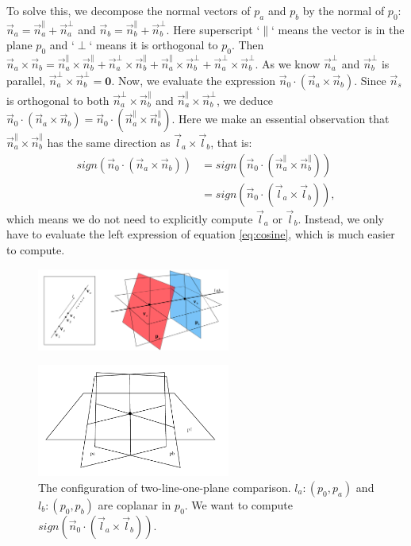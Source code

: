 \documentclass[10pt,journal,compsoc]{IEEEtran}
\begin{document}
To solve this, we decompose the normal vectors of $p_a$ and $p_b$ by the normal of $p_0$: $\vec{n}_a = \vec{n}^\parallel_a + \vec{n}^\perp_a$ and $\vec{n}_b = \vec{n}^\parallel_b + \vec{n}^\perp_b$. Here superscript `$\parallel$` means the vector is in the plane $p_0$ and `$\perp$` means it is orthogonal to $p_0$. Then $\vec{n}_a \times \vec{n}_b = \vec{n}^\parallel_a \times \vec{n}^\parallel_b + \vec{n}^\perp_a \times \vec{n}^\parallel_b + \vec{n}^\parallel_a \times \vec{n}^\perp_b + \vec{n}^\perp_a \times \vec{n}^\perp_b$. As we know $\vec{n}^\perp_a$ and $\vec{n}^\perp_b$ is parallel, $\vec{n}^\perp_a \times \vec{n}^\perp_b = \textbf{0}$. Now, we evaluate the expression $\vec{n}_0 \cdot (\vec{n}_a \times \vec{n}_b)$. Since $\vec{n}_s$ is orthogonal to both $\vec{n}^\perp_a \times \vec{n}^\parallel_b $ and $\vec{n}^\parallel_a \times \vec{n}^\perp_b $, we deduce $\vec{n}_0 \cdot (\vec{n}_a \times \vec{n}_b) = \vec{n}_0 \cdot (\vec{n}^\parallel_a \times \vec{n}^\parallel_b)$. Here we make an essential observation that $\vec{n}^\parallel_a \times \vec{n}^\parallel_b$ has the same direction as $\vec{l}_a \times \vec{l}_b$, that is:
\begin{equation}
\begin{split}
\label{eq:cosine}
sign(\vec{n}_0 \cdot (\vec{n}_a \times \vec{n}_b)) &= sign(\vec{n}_0 \cdot (\vec{n}^\parallel_a \times \vec{n}^\parallel_b)) \\
&=  sign(\vec{n}_0 \cdot (\vec{l}_a \times \vec{l}_b)),
\end{split}
\end{equation}
which means we do not need to explicitly compute $\vec{l}_a$ or $\vec{l}_b$. Instead, we only have to evaluate the left expression of equation \ref{eq:cosine}, which is much easier to compute.

\begin{figure}
  \centering
  \includegraphics[width=2.5in]{twopointoneline}\\
  \caption{{\color{red}{Sketch: config of two point one line comparison}}}\label{fig:twopointoneline}
\end{figure}

\begin{figure}[t]
\centering
\includegraphics[width=2.5in]{substrates}
\caption{The configuration of two-line-one-plane comparison. $l_a\colon(p_0, p_a)$ and $l_b\colon(p_0, p_b)$ are coplanar in $p_0$. We want to compute $sign(\vec{n}_0 \cdot (\vec{l}_a \times \vec{l}_b))$.}
\label{fig:substrates}
\end{figure}
\end{document}
